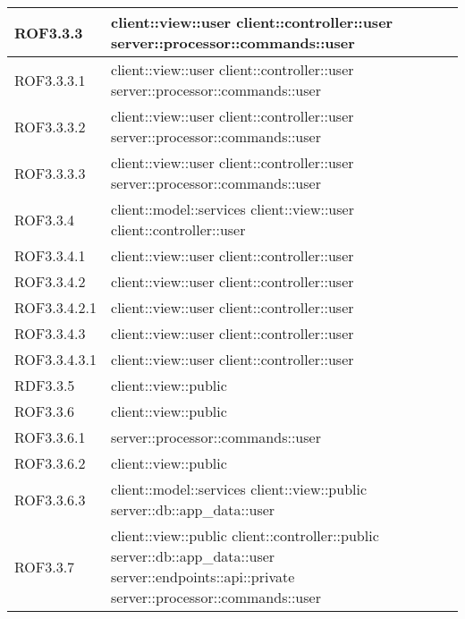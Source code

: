 \begin{center}
\begin{longtable}{| p{4cm} | p{8cm} |}
\hline
ROF3.3.3 & client::view::user \newline client::controller::user \newline server::processor::commands::user \\
\hline
ROF3.3.3.1 & client::view::user \newline client::controller::user \newline server::processor::commands::user \\
\hline
ROF3.3.3.2 & client::view::user \newline client::controller::user \newline server::processor::commands::user \\
\hline
ROF3.3.3.3 & client::view::user \newline client::controller::user \newline server::processor::commands::user \\
\hline
ROF3.3.4 & client::model::services \newline client::view::user \newline client::controller::user \\
\hline
ROF3.3.4.1 & client::view::user \newline client::controller::user \\
\hline
ROF3.3.4.2 & client::view::user \newline client::controller::user \\
\hline
ROF3.3.4.2.1 & client::view::user \newline client::controller::user \\
\hline
ROF3.3.4.3 & client::view::user \newline client::controller::user \\
\hline
ROF3.3.4.3.1 & client::view::user \newline client::controller::user \\
\hline
RDF3.3.5 & client::view::public \\
\hline
ROF3.3.6 & client::view::public \\
\hline
ROF3.3.6.1 & server::processor::commands::user \\
\hline
ROF3.3.6.2 & client::view::public \\
\hline
ROF3.3.6.3 & client::model::services \newline client::view::public \newline server::db::app\_data::user \\
\hline
ROF3.3.7 & client::view::public \newline client::controller::public \newline server::db::app\_data::user \newline server::endpoints::api::private \newline server::processor::commands::user \\

\end{longtable}
\end{center}
